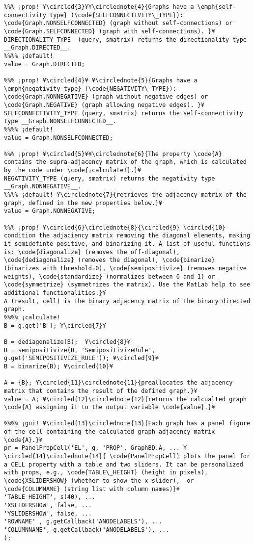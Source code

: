 \documentclass{tufte-handout}
\begin{document}
\begin{lstlisting}
%%% ¡prop! ¥\circled{3}¥¥\circlednote{4}{Graphs have a \emph{self-connectivity type} (\code{SELFCONNECTIVITY\_TYPE}): \code{Graph.NONSELFCONNECTED} (graph without self-connections) or \code{Graph.SELFCONNECTED} (graph with self-connections). }¥
DIRECTIONALITY_TYPE  (query, smatrix) returns the directionality type __Graph.DIRECTED__.
%%%% ¡default! 
value = Graph.DIRECTED;

%%% ¡prop! ¥\circled{4}¥ ¥\circlednote{5}{Graphs have a \emph{negativity type} (\code{NEGATIVITY\_TYPE}): \code{Graph.NONNEGATIVE} (graph without negative edges) or \code{Graph.NEGATIVE} (graph allowing negative edges). }¥
SELFCONNECTIVITY_TYPE (query, smatrix) returns the self-connectivity type __Graph.NONSELFCONNECTED__.
%%%% ¡default!
value = Graph.NONSELFCONNECTED;

%%% ¡prop! ¥\circled{5}¥¥\circlednote{6}{The property \code{A} contains the supra-adjacency matrix of the graph, which is calculated by the code under \code{¡calculate!}.}¥
NEGATIVITY_TYPE (query, smatrix) returns the negativity type __Graph.NONNEGATIVE__.
%%%% ¡default! ¥\circlednote{7}{retrieves the adjacency matrix of the graph, defined in the new properties below.}¥
value = Graph.NONNEGATIVE;

%%% ¡prop! ¥\circled{6}\circlednote{8}{\circled{9} \circled{10} condition the adjaciency matrix removing the diagonal elements, making it semidefinte positive, and binarizing it. A list of useful functions is: \code{diagonalize} (removes the off-diagonal), \code{dediagonalize} (removes the diagonal), \code{binarize} (binarizes with threshold=0), \code{semipositivize} (removes negative weights), \code{standardize} (normalizes between 0 and 1) or \code{symmetrize} (symmetrizes the matrix). Use the MatLab help to see additional functionalities.}¥
A (result, cell) is the binary adjacency matrix of the binary directed graph.
%%%% ¡calculate!
B = g.get('B'); ¥\circled{7}¥

B = dediagonalize(B);  ¥\circled{8}¥
B = semipositivize(B, 'SemipositivizeRule', g.get('SEMIPOSITIVIZE_RULE')); ¥\circled{9}¥
B = binarize(B); ¥\circled{10}¥

A = {B}; ¥\circled{11}\circlednote{11}{preallocates the adjacency matrix that contains the result of the defined graph.}¥
value = A; ¥\circled{12}\circlednote{12}{returns the calcualted graph \code{A} assigning it to the output variable \code{value}.}¥

%%%% ¡gui! ¥\circled{13}\circlednote{13}{Each graph has a panel figure of the cell containing the calculated graph adjacency matrix \code{A}.}¥
pr = PanelPropCell('EL', g, 'PROP', GraphBD.A, ... ¥\circled{14}\circlednote{14}{ \code{PanelPropCell} plots the panel for a CELL property with a table and two sliders. It can be personalized with props, e.g., \code{TABLE\_HEIGHT} (height in pixels), \code{XSLIDERSHOW} (whether to show the x-slider),  or \code{COLUMNAME} (string list with column names)}¥
'TABLE_HEIGHT', s(40), ... 
'XSLIDERSHOW', false, ... 
'YSLIDERSHOW', false, ...  
'ROWNAME' , g.getCallback('ANODELABELS'), ... 
'COLUMNNAME', g.getCallback('ANODELABELS'), ...
);


\end{lstlisting}
\end{document}
